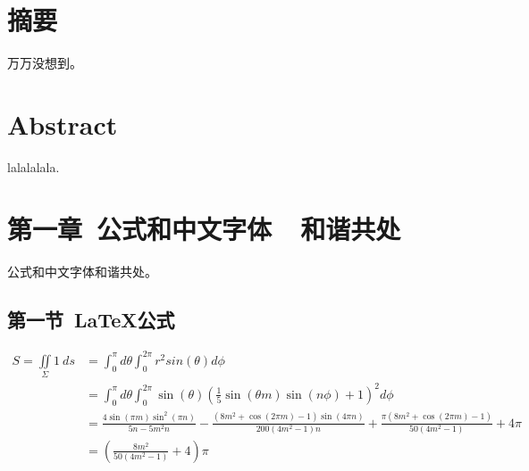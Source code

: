 \documentclass{ctexart}
\newcommand{\xiaosihao}{\fontsize{12pt}\selectfont}
\begin{document}
\pagenumbering{} %
\renewcommand{\headrulewidth}{0pt}%


\clearpage


\xiaosihao
\section*{摘要}
万万没想到。

\section*{Abstract}
lalalalala.


\clearpage
\tableofcontents
\clearpage



\renewcommand{\headrulewidth}{0.4pt} %


\setcounter{page}{1} 


\section{第一章\ 公式和中文字体\ \ 和谐共处}

公式和中文字体和谐共处。\\

\subsection{第一节\ LaTeX公式}

\begin{align*}
S=\iint\limits_{\Sigma}1 \ ds &= \int_0^{\pi}d\theta \int_0^{2\pi} r^2sin(\theta) d\phi \\
&= \int_0^{\pi}d\theta \int_0^{2\pi}\sin (\theta ) \left(\frac{1}{5} \sin (\theta  m) \sin (n \phi )+1\right)^2d\phi\\
&=\frac{4 \sin (\pi  m) \sin ^2(\pi  n)}{5 n-5 m^2 n}-\frac{\left(8 m^2+\cos (2 \pi  m)-1\right) \sin (4 \pi  n)}{200 \left(4 m^2-1\right) n}+\frac{\pi  \left(8 m^2+\cos (2 \pi  m)-1\right)}{50 \left(4 m^2-1\right)}+4 \pi\\
&=  \left(\frac{8 m^2}{50 \left(4 m^2-1\right)}+4\right)\pi
\end{align*}
\end{document}
